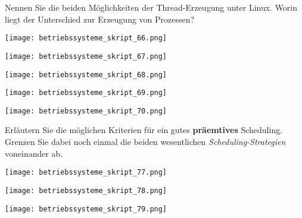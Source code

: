 \documentclass{article}
\begin{document}
\begin{tcolorbox}[colback=white!10!white,colframe=lightgray!75!black,
  savelowerto=\jobname_ex.tex,breakable,enhanced,lines before break=40]

\justifying
Nennen Sie die beiden Möglichkeiten der Thread-Erzeugung unter Linux. Worin liegt der Unterschied zur Erzeugung von Prozessen?

\tcblower

\justifying
\begin{center}
\texttt{[image: betriebssysteme\_skript\_66.png]}
\end{center}
\begin{center}
\texttt{[image: betriebssysteme\_skript\_67.png]}
\end{center}
\begin{center}
\texttt{[image: betriebssysteme\_skript\_68.png]}
\end{center}
\begin{center}
\texttt{[image: betriebssysteme\_skript\_69.png]}
\end{center}
\begin{center}
\texttt{[image: betriebssysteme\_skript\_70.png]}
\end{center}

\end{tcolorbox}
\begin{tcolorbox}[colback=white!10!white,colframe=lightgray!75!black,
  savelowerto=\jobname_ex.tex,breakable,enhanced,lines before break=40]

\justifying
Erläutern Sie die möglichen Kriterien für ein gutes \textbf{präemtives} Scheduling. Grenzen Sie dabei noch einmal die beiden wesentlichen \textit{Scheduling-Strategien} voneinander ab.

\tcblower

\justifying
\begin{center}
\texttt{[image: betriebssysteme\_skript\_77.png]}
\end{center}
\begin{center}
\texttt{[image: betriebssysteme\_skript\_78.png]}
\end{center}
\begin{center}
\texttt{[image: betriebssysteme\_skript\_79.png]}
\end{center}

\end{tcolorbox}
\end{document}

